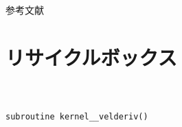 \documentclass[dvipdfmx,cjk]{beamer}
\begin{document}
\begin{frame}[allowframebreaks]{参考文献}{}
  
  
\end{frame}



% 
% 
% 








\section*{リサイクルボックス}




\subsection{}
\begin{frame}\frametitle{}
\begin{eqnarray}
\end{eqnarray}
\end{frame}


\begin{frame}[fragile]\frametitle{}
\begingroup
    \fontsize{8pt}{9pt}\selectfont
\begin{verbatim}
subroutine kernel__velderiv()
\end{verbatim}
\endgroup
\vspace{-1cm}
\end{frame}
\end{document}
